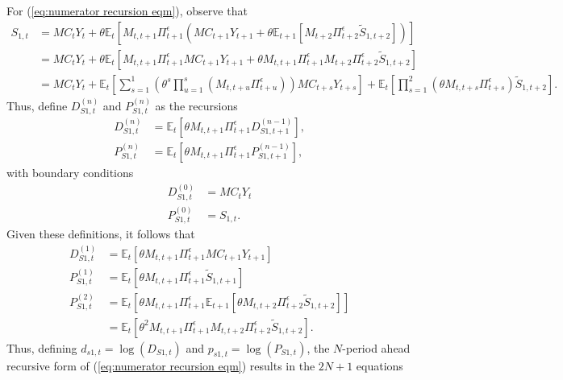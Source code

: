 \documentclass[12 pt, oneside]{article}
\theoremstyle{definition}
\theoremstyle{definition}
\theoremstyle{definition}
\newcommand{\E}{\mathbb{E}}
\begin{document}
For (\ref{eq:numerator recursion eqm}), observe that
\begin{align*}
  S_{1, t} & = MC_t Y_t + \theta\E_t[M_{t, t + 1}\Pi_{t + 1}^\epsilon (MC_{t + 1}Y_{t + 1} + \theta \E_{t + 1}[M_{ t + 2}\Pi_{t + 2}^\epsilon \tilde{S}_{1, t + 2}])]\\
                   & = MC_t Y_t + \theta\E_t[M_{t, t + 1}\Pi_{t + 1}^\epsilon MC_{t + 1}Y_{t + 1} + \theta M_{t, t + 1}\Pi_{t + 1}^\epsilon M_{ t + 2}\Pi_{t + 2}^\epsilon \tilde{S}_{1, t + 2}]\\
                   & =  MC_tY_t+ \E_t\left[\sum_{s = 1}^1 (\theta^s \prod_{u = 1}^s (M_{t, t + u}\Pi_{t + u}^\epsilon)) MC_{t + s}Y_{t + s}\right] + \E_t\left[\prod_{s = 1}^2(\theta M_{t, t + s} \Pi_{t + s}^\epsilon) \tilde{S}_{1, t + 2}\right].
\end{align*}
Thus, define $D_{S1, t}^{(n)}$ and $P_{S1, t}^{(n)}$ as the recursions
\begin{align*}
  D_{S1, t}^{(n)} & = \E_t[\theta M_{t, t + 1} \Pi_{t + 1}^\epsilon D_{S1, t + 1}^{(n - 1)}],\\
  P_{S1, t}^{(n)} & = \E_t[\theta M_{t, t + 1} \Pi_{t + 1}^\epsilon P_{S1, t + 1}^{(n - 1)}],
\end{align*}
with boundary conditions
\begin{align*}
  D_{S1, t}^{(0)} & = MC_t Y_t\\
  P_{S1, t}^{(0)} & = S_{1, t}.
\end{align*}
Given these definitions, it follows that
\begin{align*}
  D_{S1, t}^{(1)} & = \E_t[\theta M_{t, t + 1} \Pi_{t + 1}^\epsilon MC_{t + 1}Y_{t + 1}]\\
  P_{S1, t}^{(1)} & = \E_t[\theta M_{t, t + 1}\Pi_{t + 1}^\epsilon \tilde{S}_{1, t + 1}]\\
  P_{S1, t}^{(2)} & = \E_t[\theta M_{t, t + 1}\Pi_{t + 1}^\epsilon\E_{t + 1}[\theta M_{t, t + 2}\Pi_{t + 2}^\epsilon \tilde{S}_{1, t + 2}]]\\
                  & = \E_t[\theta^2 M_{t, t + 1}\Pi_{t + 1}^\epsilon M_{t, t + 2}\Pi_{t + 2}^\epsilon \tilde{S}_{1, t + 2}].
\end{align*}
Thus, defining $d_{s1, t} = \log(D_{S1, t})$ and $p_{s1, t} = \log(P_{S1, t})$,
the $N$-period ahead recursive form of (\ref{eq:numerator recursion eqm}) results in the $2N + 1$ equations
\end{document}
